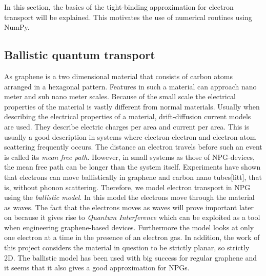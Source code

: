 In this section, the basics of the tight-binding approximation for electron transport will be explained. This motivates the use of numerical routines using NumPy.
\subsection{Ballistic quantum transport}
As graphene is a two dimensional material that consists of carbon atoms arranged in a hexagonal pattern. Features in such a material can approach nano meter and sub nano meter scales. Because of the small scale the electrical properties of the material is vastly different from normal materials. Usually when describing the electrical properties of a material, drift-diffusion current models are used. They describe electric charges per area and current per area. This is usually a good description in systems where electron-electron and electron-atom scattering frequently occurs. The distance an electron travels before such an event is called its \textit{mean free path}. However, in small systems as those of NPG-devices, the mean free path can be longer than the system itself. Experiments have shown that electrons can move ballistically in graphene and carbon nano tubes[litt], that is, without phonon scattering. Therefore, we model electron transport in NPG using the \textit{ballistic model}. In this model the electrons move through the material as waves. The fact that the electrons moves as waves will prove important later on because it gives rise to \textit{Quantum Interference} which can be exploited as a tool when engineering graphene-based devices\cite{markussen_relation_2010}. Furthermore the model looks at only one electron at a time in the presence of an electron gas. In addition, the work of this project considers the material in question to be strictly planar, so strictly 2D.  The ballistic model has been used with big success for regular graphene and it seems that it also gives a good approximation for NPGs.

